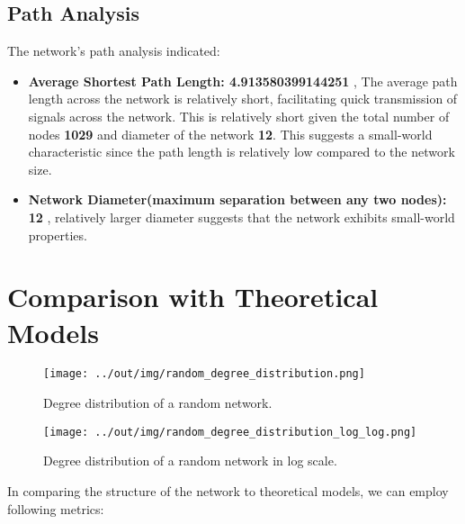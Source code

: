 \documentclass[
	report, %
	11pt, %
]{CSUniSchoolLabReport}
\begin{document}
	\subsection{Path Analysis}

	The network's path analysis indicated:
	\begin{itemize}
		\item \textbf{Average Shortest Path Length: \num{4.913580399144251}} , The average path length across the network is relatively short, facilitating quick transmission of signals across the network. This is relatively short given the total number of nodes \textbf{1029} and diameter of the network \textbf{12}. This suggests a small-world characteristic since the path length is relatively low compared to the network size.
		\item \textbf{Network Diameter(maximum separation between any two nodes): 12} , relatively larger diameter suggests that the network exhibits small-world properties.
	\end{itemize}


	\section{Comparison with Theoretical Models}

	\begin{figure}[H]
		\centering
		\captionsetup{justification=centering}
		\texttt{[image: ../out/img/random\_degree\_distribution.png]}
		\caption{Degree distribution of a random network.}
		\label{fig:random_deg_dist}
	\end{figure}

	\begin{figure}[H]
		\centering
		\captionsetup{justification=centering}
		\texttt{[image: ../out/img/random\_degree\_distribution\_log\_log.png]}
		\caption{Degree distribution of a random network in log scale.}
		\label{fig:random_log_deg_dist}
	\end{figure}

	In comparing the structure of the network to theoretical models, we can employ following metrics:
	
\end{document}
